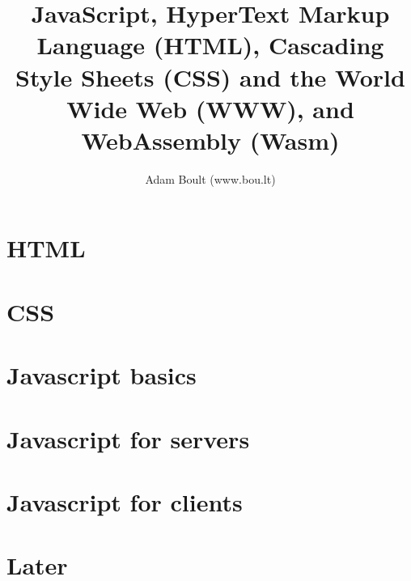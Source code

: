 \documentclass[oneside]{book}
\begin{document}
\author{Adam Boult (www.bou.lt)}
\title{JavaScript, HyperText Markup Language (HTML), Cascading Style Sheets (CSS) and the World Wide Web (WWW), and WebAssembly (Wasm)}
\maketitle

\setcounter{tocdepth}{0}
\tableofcontents



\part{HTML}


\part{CSS}


\part{Javascript basics}







\part{Javascript for servers}







\part{Javascript for clients}




\part{Later}


\end{document}
